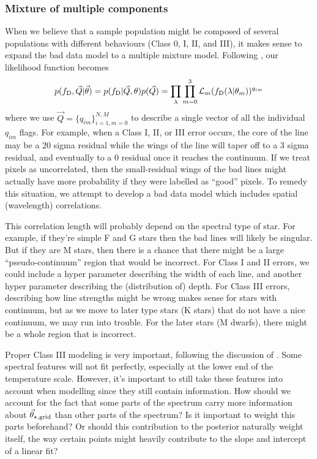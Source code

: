 \documentclass[preprint]{aastex} %
\newcommand{\qM}{\{q_{im}\}_{i=1,m=0}^{N,M}}
\newcommand{\vt}{\vec{\theta}}
\newcommand{\vg}{\vt_{\star, {\rm grid}}}
\newcommand{\fD}{f_{\rm D}}
\begin{document}
\subsubsection{Mixture of multiple components}
When we believe that a sample population might be composed of several populations with different behaviours (Class 0, I, II, and III), it makes sense to expand the bad data model to a multiple mixture model. Following \citet{gcs+04}, our likelihood function becomes
\begin{equation}
  p(\fD, \vec{Q} | \vt) = p(\fD | \vec{Q}, \theta) p(\vec{Q}) = \prod_\lambda \prod_{m = 0}^3  {\cal L}_m(\fD(\lambda | \theta_m))^{q_{im}}
\end{equation}
where we use $\vec{Q} = \qM$ to describe a single vector of all the individual $q_{im}$ flags. For example, when a Class I, II, or III error occurs, the core of the line may be a 20 sigma residual while the wings of the line will taper off to a 3 sigma residual, and eventually to a 0 residual once it reaches the continuum. If we treat pixels as uncorrelated, then the small-residual wings of the bad lines might actually have more probability if they were labelled as ``good'' pixels. To remedy this situation, we attempt to develop a bad data model which includes spatial (wavelength) correlations.

This correlation length will probably depend on the spectral type of star. For example, if they're simple F and G stars then the bad lines will likely be singular. But if they are M stars, then there is a chance that there might be a large ``pseudo-continuum'' region that would be incorrect. For Class I and II errors, we could include a hyper parameter describing the width of each line, and another hyper parameter describing the (distribution of) depth. For Class III errors, describing how line strengths might be wrong makes sense for stars with continuum, but as we move to later type stars (K stars) that do not have a nice continuum, we may run into trouble. For the later stars (M dwarfs), there might be a whole region that is incorrect.

Proper Class III modeling is very important, following the discussion of \citep{mga13}. Some spectral features will not fit perfectly, especially at the lower end of the temperature scale. However, it's important to still take these features into account when modelling since they still contain information. How should we account for the fact that some parts of the spectrum carry more information about $\vg$ than other parts of the spectrum? Is it important to weight this parts beforehand? Or should this contribution to the posterior naturally weight itself, the way certain points might heavily contribute to the slope and intercept of a linear fit?
\end{document}
